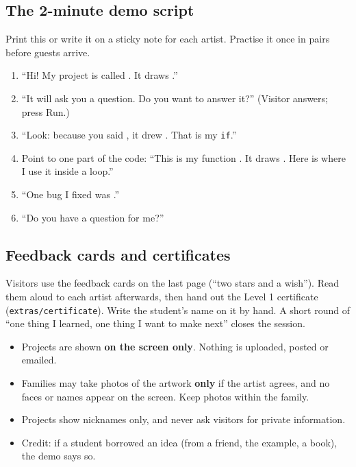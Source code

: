 \documentclass[level=1,teacher]{kidscode}
\begin{document}
\subsection{The 2-minute demo script}
Print this or write it on a sticky note for each artist. Practise it once in pairs before guests arrive.
\begin{enumerate}[itemsep=2pt]
  \item \enquote{Hi! My project is called \underline{\hspace{3cm}}. It draws \underline{\hspace{4cm}}.}
  \item \enquote{It will ask you a question. Do you want to answer it?} (Visitor answers; press Run.)
  \item \enquote{Look: because you said \underline{\hspace{2cm}}, it drew \underline{\hspace{3cm}}. That is my \texttt{if}.}
  \item Point to one part of the code: \enquote{This is my function \underline{\hspace{2cm}}. It draws \underline{\hspace{2.5cm}}.
        Here is where I use it inside a loop.}
  \item \enquote{One bug I fixed was \underline{\hspace{4cm}}.}
  \item \enquote{Do you have a question for me?}
\end{enumerate}

\subsection{Feedback cards and certificates}
Visitors use the feedback cards on the last page (\enquote{two stars and a wish}). Read them aloud
to each artist afterwards, then hand out the Level 1 certificate (\texttt{extras/\allowbreak{}certificate}). Write
the student's name on it by hand. A short round of \enquote{one thing I learned, one thing I want to
make next} closes the session.

\begin{safety}
\begin{itemize}[itemsep=1pt]
  \item Projects are shown \textbf{on the screen only}. Nothing is uploaded, posted or emailed.
  \item Families may take photos of the artwork \textbf{only} if the artist agrees, and no faces or
        names appear on the screen. Keep photos within the family.
  \item Projects show nicknames only, and never ask visitors for private information.
  \item Credit: if a student borrowed an idea (from a friend, the example, a book), the demo says so.
\end{itemize}
\end{safety}
\end{document}
